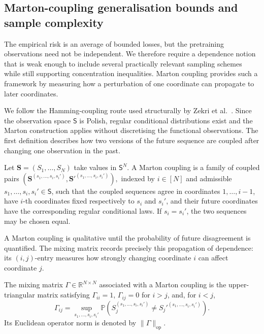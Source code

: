 \subsection{Marton-coupling generalisation bounds and sample complexity}
\label{subsec:Marton coupling generalisation}

The empirical risk is an average of bounded losses, but the pretraining observations need not be independent. We therefore require a dependence notion that is weak enough to include several practically relevant sampling schemes while still supporting concentration inequalities. Marton coupling provides such a framework by measuring how a perturbation of one coordinate can propagate to later coordinates.

We follow the Hamming-coupling route used structurally by Zekri et al.~\cite{ZekriEtAl2025}. Since the observation space \(\mathsf S\) is Polish, regular conditional distributions exist and the Marton construction applies without discretising the functional observations.
The first definition describes how two versions of the future sequence are coupled after changing one observation in the past.

\begin{definition}
\label{def:Marton coupling}
Let \(\mathbf S=(S_1,\ldots,S_N)\) take values in \(\mathsf S^N\). A Marton coupling is a family of coupled pairs
\(
\left(
\mathbf S^{(s_1,\ldots,s_i,s_i')},
\mathbf S'^{(s_1,\ldots,s_i,s_i')}
\right),
\)
indexed by \(i\in[N]\) and admissible \(s_1,\ldots,s_i,s_i'\in\mathsf S\), such that the coupled sequences agree in coordinates \(1,\ldots,i-1\), have \(i\)-th coordinates fixed respectively to \(s_i\) and \(s_i'\), and their future coordinates have the corresponding regular conditional laws. If \(s_i=s_i'\), the two sequences may be chosen equal.
\end{definition}

A Marton coupling is qualitative until the probability of future disagreement is quantified. The mixing matrix records precisely this propagation of dependence: its \((i,j)\)-entry measures how strongly changing coordinate \(i\) can affect coordinate \(j\).

\begin{definition}
\label{def:Marton mixing matrix}
The mixing matrix \(\Gamma\in\mathbb R^{N\times N}\) associated with a Marton coupling is the upper-triangular matrix satisfying \(\Gamma_{ii}=1\), \(\Gamma_{ij}=0\) for \(i>j\), and, for \(i<j\),
\[
\Gamma_{ij}
=
\sup_{s_1,\ldots,s_i,s_i'}
\mathbb P
\left(
S_j^{(s_1,\ldots,s_i,s_i')}
\neq
S_j'^{(s_1,\ldots,s_i,s_i')}
\right).
\]
Its Euclidean operator norm is denoted by \(\|\Gamma\|_{\mathrm{op}}\).
\end{definition}


